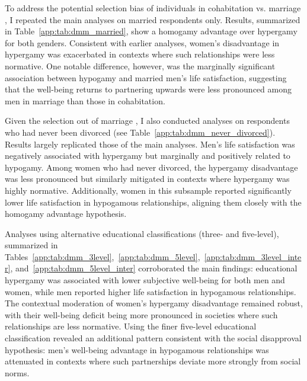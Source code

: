 To address the potential selection bias of individuals in cohabitation vs. marriage \parencite{dominguez-folguerasCohabitationMoreEgalitarian2013,esteveEducationalHomogamyGap2013,soonsMarriageMoreCohabitation2009}, I repeated the main analyses on married respondents only. Results, summarized in Table~\ref{app:tab:dmm_married}, show a homogamy advantage over hypergamy for both genders. Consistent with earlier analyses, women's disadvantage in hypergamy was exacerbated in contexts where such relationships were less normative. One notable difference, however, was the marginally significant association between hypogamy and married men's life satisfaction, suggesting that the well-being returns to partnering upwards were less pronounced among men in marriage than those in cohabitation.

Given the selection out of marriage \parencite{kalmijnUnionDisruptionNetherlands2003,theunisHisHerEducation2018}, I also conducted analyses on respondents who had never been divorced (see Table~\ref{app:tab:dmm_never_divorced}). Results largely replicated those of the main analyses. Men's life satisfaction was negatively associated with hypergamy but marginally and positively related to hypogamy. Among women who had never divorced, the hypergamy disadvantage was less pronounced but similarly mitigated in contexts where hypergamy was highly normative. Additionally, women in this subsample reported significantly lower life satisfaction in hypogamous relationships, aligning them closely with the homogamy advantage hypothesis.

Analyses using alternative educational classifications (three- and five-level), summarized in Tables~\ref{app:tab:dmm_3level},~\ref{app:tab:dmm_5level},~\ref{app:tab:dmm_3level_inter}, and~\ref{app:tab:dmm_5level_inter} corroborated the main findings: educational hypergamy was associated with lower subjective well-being for both men and women, while men reported higher life satisfaction in hypogamous relationships. The contextual moderation of women's hypergamy disadvantage remained robust, with their well-being deficit being more pronounced in societies where such relationships are less normative. Using the finer five-level educational classification revealed an additional pattern consistent with the social disapproval hypothesis: men's well-being advantage in hypogamous relationships was attenuated in contexts where such partnerships deviate more strongly from social norms.
